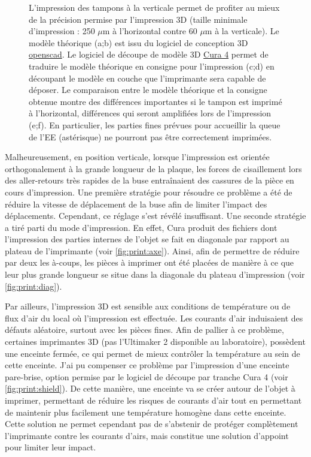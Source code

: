 \documentclass[\main/main.tex]{subfiles}
\begin{document}
\begin{figure}[h!]
    \caption{
        \label{fig:coupe}
        L'impression des tampons à la verticale permet de profiter au mieux de la précision permise par l'impression 3D (taille minimale d'impression : 250 $\mu$m à l'horizontal contre 60 $\mu$m à la verticale).
        \newline
        Le modèle théorique (a;b) est issu du logiciel de conception 3D \href{https://www.openscad.org/}{openscad}.
        Le logiciel de découpe de modèle 3D \href{https://ultimaker.com/fr/software/ultimaker-cura}{Cura 4} permet de traduire le modèle théorique en consigne pour l'impression (c;d) en découpant le modèle en couche que l'imprimante sera capable de déposer.
        Le comparaison entre le modèle théorique et la consigne obtenue montre des différences importantes si le tampon est imprimé à l'horizontal, différences qui seront amplifiées lors de l'impression (e;f).
        En particulier, les parties fines prévues pour accueillir la queue de l'EE (astérisque) ne pourront pas être correctement imprimées.
    }
    
\end{figure}

%
Malheureusement, en position verticale, lorsque l'impression est orientée orthogonalement à la grande longueur de la plaque, les forces de cisaillement lors des aller-retours très rapides de la buse entraînaient des cassures de la pièce en cours d'impression.
%
Une première stratégie pour résoudre ce problème a été de réduire la vitesse de déplacement de la buse afin de limiter l'impact des déplacements. Cependant, ce réglage s'est révélé insuffisant.
%
Une seconde stratégie a tiré parti du mode d'impression. En effet, Cura produit des fichiers dont l'impression des parties internes de l'objet se fait en diagonale par rapport au plateau de l'imprimante (voir \autoref{fig:print:axe}).
Ainsi, afin de permettre de réduire par deux les à-coups, les pièces à imprimer ont été placées de manière à ce que leur plus grande longueur se situe dans la diagonale du plateau d'impression (voir \autoref{fig:print:diag}).

%
Par ailleurs, l'impression 3D est sensible aux conditions de température ou de flux d'air du local où l'impression est effectuée. Les courants d'air induisaient des défauts aléatoire, surtout avec les pièces fines. Afin de pallier à ce problème, certaines imprimantes 3D (pas l'Ultimaker 2 disponible au laboratoire), possèdent une enceinte fermée, ce qui permet de mieux contrôler la température au sein de cette enceinte. 
%
J'ai pu compenser ce problème par l'impression d'une enceinte pare-brise, option permise par le logiciel de découpe par tranche Cura 4 (voir \autoref{fig:print:shield}).
%
De cette manière, une enceinte va se créer autour de l'objet à imprimer, permettant de réduire les risques de courants d'air tout en permettant de maintenir plus facilement une température homogène dans cette enceinte.
%
Cette solution ne permet cependant pas de s'abstenir de protéger complètement l'imprimante contre les courants d'airs, mais constitue une solution d'appoint pour limiter leur impact.
\end{document}
